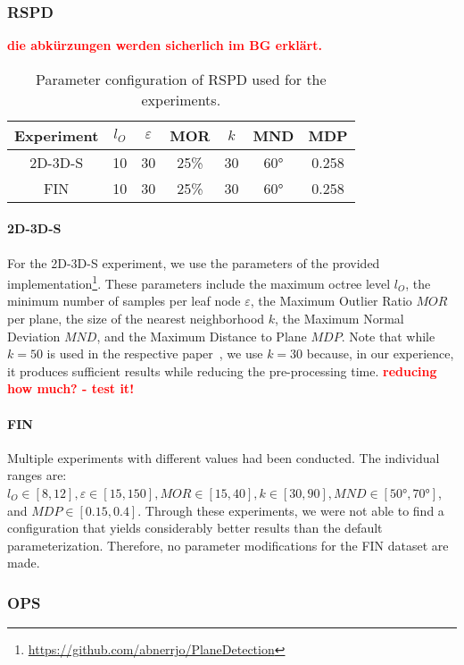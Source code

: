 \documentclass[main.tex]{subfiles}
\begin{document}
\subsubsection{RSPD}
\textbf{\textcolor{red}{die abkürzungen werden sicherlich im BG erklärt.}}
\begin{table}[H]
    \centering
    \begin{tabular}{c|cccccc}
        Experiment & $l_O$ & $\varepsilon$ & MOR  & $k$ & MND & MDP   \\ \hline
        2D-3D-S    & 10    & 30            & 25\% & 30  & 60° & 0.258 \\
        FIN        & 10    & 30            & 25\% & 30  & 60° & 0.258
    \end{tabular}%
    \caption{Parameter configuration of RSPD used for the experiments.}
    \label{tab:rspd-param}
\end{table}

\paragraph{2D-3D-S}
For the 2D-3D-S experiment, we use the parameters of the provided implementation\footnote{\href{https://github.com/abnerrjo/PlaneDetection}{https://github.com/abnerrjo/PlaneDetection}}. These parameters include the maximum octree level $l_O$,
the minimum number of samples per leaf node $\varepsilon$, the Maximum Outlier Ratio $MOR$ per plane, the size of the nearest neighborhood $k$,
the Maximum Normal Deviation $MND$, and the Maximum Distance to Plane $MDP$. Note that while $k=50$ is used in the respective paper~\cite[Section~3.3]{Araújo_Oliveira_2020},
we use $k=30$ because, in our experience, it produces sufficient results while reducing the pre-processing time.
\textbf{\textcolor{red}{reducing how much? - test it!}}

\paragraph{FIN}
Multiple experiments with different values had been conducted. The individual ranges are: $l_O \in [8,12], \varepsilon \in [15, 150],
    MOR \in [15, 40], k \in [30, 90], MND \in [50°, 70°]$, and $MDP \in [0.15, 0.4]$.
Through these experiments, we were not able to find a configuration that yields considerably better results than the default
parameterization. Therefore, no parameter modifications for the FIN dataset are made.


\subsubsection{OPS}
\end{document}
